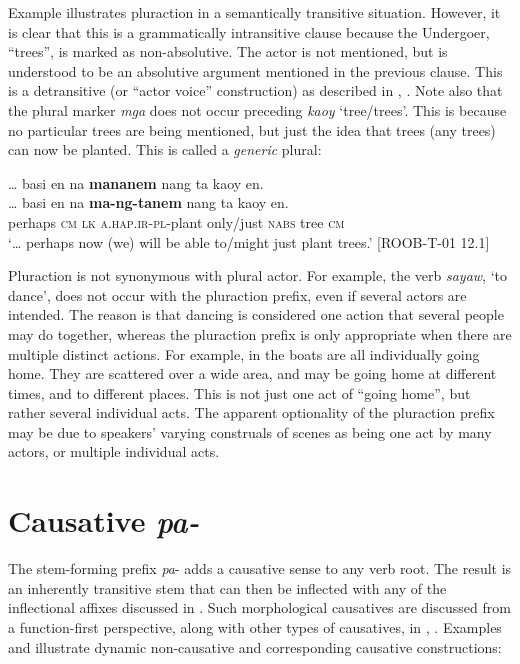Example  illustrates pluraction in a semantically transitive situation. However, it is clear that this is a grammatically intransitive clause because the Undergoer, “trees”, is marked as non-absolutive. The actor is not mentioned, but is understood to be an absolutive argument mentioned in the previous clause. This is a detransitive (or “actor voice” construction) as described in , . Note also that the plural marker \textit{mga} does not occur preceding \textit{kaoy} ‘tree/trees’. This is because no particular trees are being mentioned, but just the idea that trees (any trees) can now be planted. This is called a \textit{generic} plural:

\ea
\label{bkm:Ref397352255}
… basi  en  na  \textbf{mananem}  nang  ta  kaoy  en. \\\smallskip
\gll … basi  en  na  \textbf{ma-ng-tanem}  nang  ta  kaoy  en. \\
  {}  perhaps  \textsc{cm}  \textsc{lk}  \textsc{a.hap.ir-pl-}plant  only/just  \textsc{nabs}  tree  \textsc{cm} \\
\glt ‘… perhaps now (we) will be able to/might just plant trees.’ [ROOB-T-01 12.1]
\z

Pluraction is not synonymous with plural actor. For example, the verb \textit{sayaw}, ‘to dance’, does not occur with the pluraction prefix, even if several actors are intended. The reason is that dancing is considered one action that several people may do together, whereas the pluraction prefix is only appropriate when there are multiple distinct actions. For example, in  the boats are all individually going home. They are scattered over a wide area, and may be going home at different times, and to different places. This is not just one act of “going home”, but rather several individual acts. The apparent optionality of the pluraction prefix may be due to speakers’ varying construals of scenes as being one act by many actors, or multiple individual acts.

\section{Causative \textit{pa-}}
\label{sec:morphologicalcausative}

The stem-forming prefix \textit{pa}{}- adds a causative sense to any verb root. The result is an inherently transitive stem that can then be inflected with any of the inflectional affixes discussed in . Such morphological causatives are discussed from a function-first perspective, along with other types of causatives, in , . Examples  and  illustrate dynamic non-causative and corresponding causative constructions:

